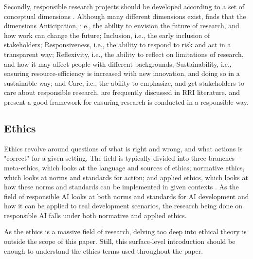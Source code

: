 Secondly, responsible research projects should be developed according to a set of conceptual dimensions \parencite{Burget_2017_RRI}. Although many different dimensions exist, \textcite{Burget_2017_RRI} finds that the dimensions Anticipation, i.e., the ability to envision the future of research, and how work can change the future; Inclusion, i.e., the early inclusion of stakeholders; Responsiveness, i.e., the ability to respond to risk and act in a transparent way; Reflexivity, i.e., the ability to reflect on limitations of research, and how it may affect people with different backgrounds; Sustainability, i.e., ensuring resource-efficiency is increased with new innovation, and doing so in a sustainable way; and Care, i.e., the ability to emphasize, and get stakeholders to care about responsible research, are frequently discussed in RRI literature, and present a good framework for ensuring research is conducted in a responsible way.


\subsection{Ethics}
Ethics revolve around questions of what is right and wrong, and what actions is "correct" for a given setting. The field is typically divided into three branches -- meta-ethics, which looks at the language and sources of ethics; normative ethics, which looks at norms and standards for action; and applied ethics, which looks at how these norms and standards can be implemented in given contexts \parencite{Clarke_2019}. As the field of responsible AI looks at both norms and standards for AI development and how it can be applied to real development scenarios, the research being done on responsible AI falls under both normative and applied ethics.

As the ethics is a massive field of research, delving too deep into ethical theory is outside the scope of this paper. Still, this surface-level introduction should be enough to understand the ethics terms used throughout the paper.

